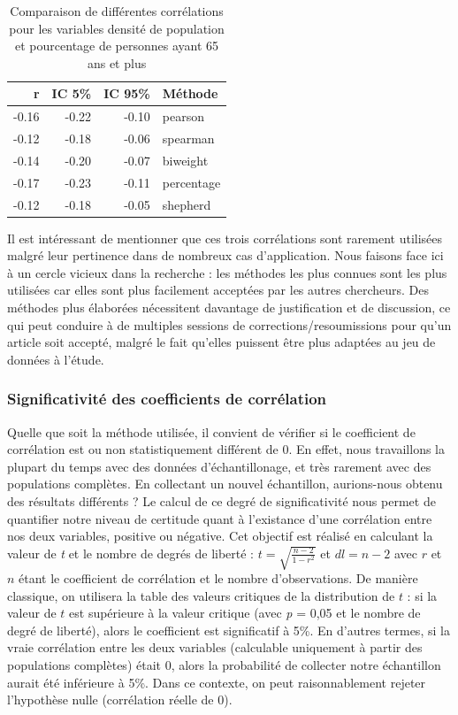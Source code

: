 \documentclass[
  11pt,
  french,
]{book}
\begin{document}
\begin{table}

\caption{\label{tab:robcorr}Comparaison de différentes corrélations pour les variables densité de population et pourcentage de personnes ayant 65 ans et plus}
\centering
\fontsize{8}{10}\selectfont
\begin{tabular}[t]{r|r|r|l}
\hline
r & IC 5\% & IC 95\% & Méthode\\
\hline
-0.16 & -0.22 & -0.10 & pearson\\
\hline
-0.12 & -0.18 & -0.06 & spearman\\
\hline
-0.14 & -0.20 & -0.07 & biweight\\
\hline
-0.17 & -0.23 & -0.11 & percentage\\
\hline
-0.12 & -0.18 & -0.05 & shepherd\\
\hline
\end{tabular}
\end{table}

Il est intéressant de mentionner que ces trois corrélations sont rarement utilisées malgré leur pertinence dans de nombreux cas d'application. Nous faisons face ici à un cercle vicieux dans la recherche : les méthodes les plus connues sont les plus utilisées car elles sont plus facilement acceptées par les autres chercheurs. Des méthodes plus élaborées nécessitent davantage de justification et de discussion, ce qui peut conduire à de multiples sessions de corrections/resoumissions pour qu'un article soit accepté, malgré le fait qu'elles puissent être plus adaptées au jeu de données à l'étude.

\hypertarget{sect04135}{%
\subsubsection{Significativité des coefficients de corrélation}\label{sect04135}}

Quelle que soit la méthode utilisée, il convient de vérifier si le coefficient de corrélation est ou non statistiquement différent de 0. En effet, nous travaillons la plupart du temps avec des données d'échantillonage, et très rarement avec des populations complètes. En collectant un nouvel échantillon, aurions-nous obtenu des résultats différents ? Le calcul de ce degré de significativité nous permet de quantifier notre niveau de certitude quant à l'existance d'une corrélation entre nos deux variables, positive ou négative. Cet objectif est réalisé en calculant la valeur de \emph{t} et le nombre de degrés de liberté : \(t=\sqrt{\frac{n-2}{1-r^2}}\) et \(dl = n-2\) avec \(r\) et \(n\) étant le coefficient de corrélation et le nombre d'observations. De manière classique, on utilisera la table des valeurs critiques de la distribution de \(t\) : si la valeur de \(t\) est supérieure à la valeur critique (avec \emph{p} = 0,05 et le nombre de degré de liberté), alors le coefficient est significatif à 5\%. En d'autres termes, si la vraie corrélation entre les deux variables (calculable uniquement à partir des populations complètes) était 0, alors la probabilité de collecter notre échantillon aurait été inférieure à 5\%. Dans ce contexte, on peut raisonnablement rejeter l'hypothèse nulle (corrélation réelle de 0).
\end{document}

